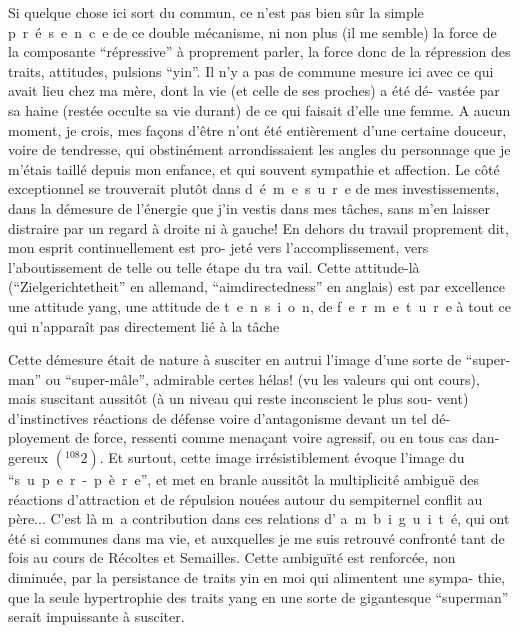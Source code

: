 Si quelque chose ici sort du commun, ce n'est pas bien sûr la simple
\mbox{p r é s e n c e} de ce double mécanisme, ni non plus (il me semble) la force de
la composante ``répressive'' à proprement parler, la force donc de la répression
des traits, attitudes, pulsions ``yin''. Il n'y a pas de commune mesure ici avec
ce qui avait lieu chez ma mère, dont la vie (et celle de ses proches) a été dé-\linebreak
vastée par sa haine (restée occulte sa vie durant) de ce qui faisait d'elle une
femme. A aucun moment, je crois, mes façons d'être n'ont été entièrement 
d'une certaine douceur, voire de tendresse, qui obstinément arrondissaient les
angles du personnage que je m'étais taillé depuis mon enfance, et qui 
souvent sympathie et affection. Le côté exceptionnel se trouverait plutôt dans 
\mbox{d é m e s u r e} de mes investissements, dans la démesure de l'énergie que j'in\linebreak
vestis dans mes tâches, sans m'en laisser distraire par un regard à droite ni à
gauche! En dehors du travail proprement dit, mon esprit continuellement est pro-\linebreak
jeté vers l'accomplissement, vers l'aboutissement de telle ou telle étape du tra\linebreak
vail. Cette attitude-là (``Zielgerichtetheit'' en allemand, ``aimdirectedness'' en
anglais) est par excellence une attitude yang, une attitude de \mbox{t e n s i o n},
de \mbox{f e r m e t u r e} à tout ce qui n'apparaît pas directement lié à la tâche

Cette démesure était de nature à susciter en autrui l'image d'une sorte de
``super-man'' ou ``super-mâle'', admirable certes hélas! (vu les valeurs qui ont
cours), mais suscitant aussitôt (à un niveau qui reste inconscient le plus sou-\linebreak
vent) d'instinctives réactions de défense voire d'antagonisme devant un tel dé-\linebreak
ployement de force, ressenti comme menaçant voire agressif, ou en tous cas dan-\linebreak
gereux \(({}^{108}2)\). Et surtout, cette image irrésistiblement évoque l'image du
``\mbox{s u p e r - p è r e}'', et met en branle aussitôt la multiplicité ambiguë des
réactions d'attraction et de répulsion nouées autour du sempiternel conflit au
père... C'est là \mbox{m a} contribution dans ces relations d' \mbox{a m b i g u i t é},
qui ont été si communes dans ma vie, et auxquelles je me suis retrouvé confronté
tant de fois au cours de Récoltes et Semailles. Cette ambiguïté est renforcée,
non diminuée, par la persistance de traits yin en moi qui alimentent une sympa-\linebreak
thie, que la seule hypertrophie des traits yang en une sorte de gigantesque
``superman'' serait impuissante à susciter.

